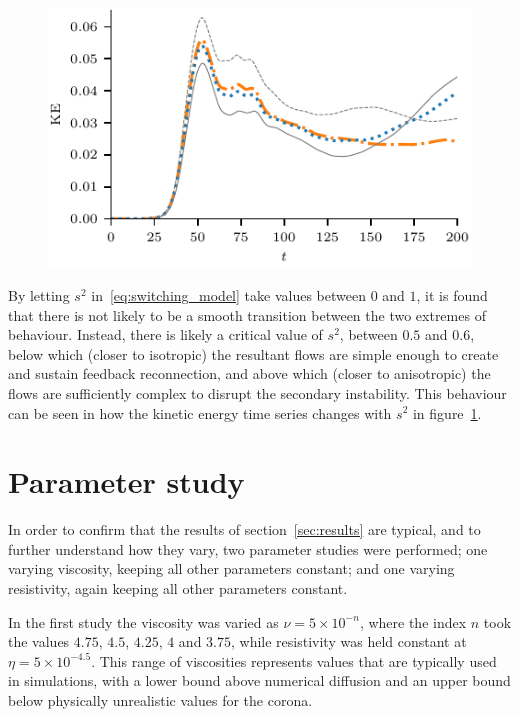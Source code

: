 \begin{figure}[t]
  \centering
  \includegraphics[width=0.5\linewidth]{kinetic-energy-changing-s.pdf}
  \label{fig:kinetic-energy-changing-s}
\end{figure}

By letting $s^2$ in~\eqref{eq:switching_model} take values between $0$ and $1$, it is found that there is not likely to be a smooth transition between the two extremes of behaviour. Instead, there is likely a critical value of $s^2$, between $0.5$ and $0.6$, below which (closer to isotropic) the resultant flows are simple enough to create and sustain feedback reconnection, and above which (closer to anisotropic) the flows are sufficiently complex to disrupt the secondary instability. This behaviour can be seen in how the kinetic energy time series changes with $s^2$ in figure~\ref{fig:kinetic-energy-changing-s}.

\section{Parameter study}
\label{sec:results2}

In order to confirm that the results of section~\ref{sec:results} are typical, and to further understand how they vary, two parameter studies were performed; one varying viscosity, keeping all other parameters constant; and one varying resistivity, again keeping all other parameters constant. 

In the first study the viscosity was varied as $\nu = 5 \times 10^{-n}$, where the index $n$ took the values $4.75$, $4.5$, $4.25$, $4$ and $3.75$, while resistivity was held constant at $\eta = 5\times10^{-4.5}$. This range of viscosities represents values that are typically used in simulations, with a lower bound above numerical diffusion and an upper bound below physically unrealistic values for the corona.

